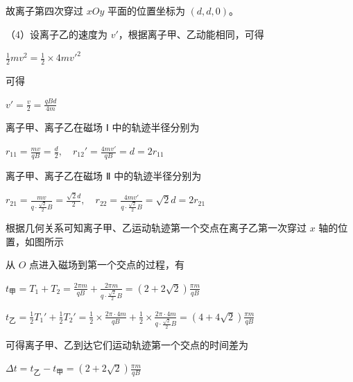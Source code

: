 \documentclass[\gkver]{gaokaozhenti}
\begin{document}
\begin{enumerate}
{故离子第四次穿过 $xOy$ 平面的位置坐标为 $(d, d, 0)$。

（4）设离子乙的速度为 $v'$，根据离子甲、乙动能相同，可得

$\frac{1}{2}mv^{2} = \frac{1}{2} \times 4mv'^{2}$

可得

$v' = \frac{v}{2} = \frac{qBd}{4m}$

离子甲、离子乙在磁场 Ⅰ 中的轨迹半径分别为

$r_{11} = \frac{mv}{qB} = \frac{d}{2},\quad r_{12}' = \frac{4mv'}{qB} = d = 2r_{11}$

离子甲、离子乙在磁场 Ⅱ 中的轨迹半径分别为

$r_{21} = \frac{mv}{q \cdot \frac{\sqrt{2}}{2}B} = \frac{\sqrt{2}d}{2},\quad r_{22} = \frac{4mv'}{q \cdot \frac{\sqrt{2}}{2}B} = \sqrt{2}d = 2r_{21}$

根据几何关系可知离子甲、乙运动轨迹第一个交点在离子乙第一次穿过 $x$ 轴的位置，如图所示


从 $O$ 点进入磁场到第一个交点的过程，有

$t_{\text{甲}} = T_{1} + T_{2} = \frac{2\pi m}{qB} + \frac{2\pi m}{q \cdot \frac{\sqrt{2}}{2}B} = (2 + 2\sqrt{2})\frac{\pi m}{qB}$

$t_{\text{乙}} = \frac{1}{2}T_{1}' + \frac{1}{2}T_{2}' = \frac{1}{2} \times \frac{2\pi \cdot 4m}{qB} + \frac{1}{2} \times \frac{2\pi \cdot 4m}{q \cdot \frac{\sqrt{2}}{2}B} = (4 + 4\sqrt{2})\frac{\pi m}{qB}$

可得离子甲、乙到达它们运动轨迹第一个交点的时间差为

$\Delta t = t_{\text{乙}} - t_{\text{甲}} = (2 + 2\sqrt{2})\frac{\pi m}{qB}$
}


\end{enumerate}
\end{document}
